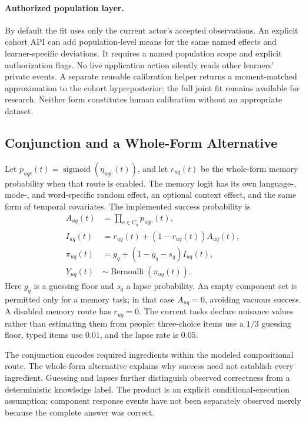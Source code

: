 \documentclass{article}
\newcommand{\sig}{\operatorname{sigmoid}}
\begin{document}
\paragraph{Authorized population layer.}
By default the fit uses only the current actor's accepted observations.
An explicit cohort API can add population-level means for the same named
effects and learner-specific deviations. It requires a named population
scope and explicit authorization flags. No live application action silently
reads other learners' private events. A separate reusable calibration helper
returns a moment-matched approximation to the cohort hyperposterior; the full
joint fit remains available for research. Neither form constitutes human
calibration without an appropriate dataset.

\subsection{Conjunction and a Whole-Form Alternative}

Let \(p_{uqc}(t)=\sig(\eta_{uqc}(t))\), and let
\(r_{uq}(t)\) be the whole-form memory probability when that route is enabled.
The memory logit has its own language-, mode-, and word-specific random
effect, an optional context effect, and the same form of temporal covariates.
The implemented success probability is
\begin{equation}
\begin{split}
 A_{uq}(t)&=\prod_{c\in C_q}p_{uqc}(t),\\
 I_{uq}(t)&=r_{uq}(t)+(1-r_{uq}(t))A_{uq}(t),\\
 \pi_{uq}(t)&=g_q+(1-g_q-s_q)I_{uq}(t),\\
 Y_{uq}(t)&\sim\operatorname{Bernoulli}(\pi_{uq}(t)).
\end{split}
\label{eq:likelihood}
\end{equation}
Here \(g_q\) is a guessing floor and \(s_q\) a lapse probability.
An empty component set is permitted only for a memory task; in that case
\(A_{uq}=0\), avoiding vacuous success. A disabled memory route has \(r_{uq}=0\).
The current tasks declare nuisance values rather than estimating them from
people: three-choice items use a \(1/3\) guessing floor, typed items use
\(0.01\), and the lapse rate is \(0.05\).

The conjunction encodes required ingredients within the modeled compositional
route. The whole-form alternative explains why success need not establish
every ingredient. Guessing and lapses further distinguish observed correctness
from a deterministic knowledge label. The product is an explicit
conditional-execution assumption; component response events have not been
separately observed merely because the complete answer was correct.
\end{document}
